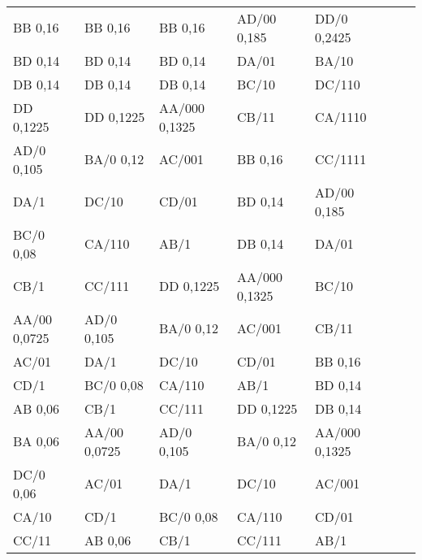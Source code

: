\documentclass[12pt]{article}
\begin{document}
\begin{enumerate}
\begin{tabular}{|l|l|l|l|l|l|ll}
\end{tabular}
\\
\\
\\
\begin{tabular}{|l|l|l|l|l|ll}
\cline{1-5}
BB 0,16      & BB 0,16      & BB 0,16       & AD/00 0,185   & DD/0 0,2425   &  &  \\ \cline{1-3}
BD 0,14      & BD 0,14      & BD 0,14       & DA/01         & BA/10         &  &  \\ \cline{1-3}
DB 0,14      & DB 0,14      & DB 0,14       & BC/10         & DC/110        &  &  \\ \cline{1-3}
DD 0,1225    & DD 0,1225    & AA/000 0,1325 & CB/11         & CA/1110       &  &  \\ \cline{1-2} \cline{4-4}
AD/0 0,105   & BA/0 0,12    & AC/001        & BB 0,16       & CC/1111       &  &  \\ \cline{4-5}
DA/1         & DC/10        & CD/01         & BD 0,14       & AD/00 0,185   &  &  \\ \cline{1-1} \cline{4-4}
BC/0 0,08    & CA/110       & AB/1          & DB 0,14       & DA/01         &  &  \\ \cline{3-4}
CB/1         & CC/111       & DD 0,1225     & AA/000 0,1325 & BC/10         &  &  \\ \cline{1-3}
AA/00 0,0725 & AD/0 0,105   & BA/0 0,12     & AC/001        & CB/11         &  &  \\ \cline{5-5}
AC/01        & DA/1         & DC/10         & CD/01         & BB 0,16       &  &  \\ \cline{2-2} \cline{5-5}
CD/1         & BC/0 0,08    & CA/110        & AB/1          & BD 0,14       &  &  \\ \cline{1-1} \cline{4-5}
AB 0,06      & CB/1         & CC/111        & DD 0,1225     & DB 0,14       &  &  \\ \cline{1-5}
BA 0,06      & AA/00 0,0725 & AD/0 0,105    & BA/0 0,12     & AA/000 0,1325 &  &  \\ \cline{1-1}
DC/0 0,06    & AC/01        & DA/1          & DC/10         & AC/001        &  &  \\ \cline{3-3}
CA/10        & CD/1         & BC/0 0,08     & CA/110        & CD/01         &  &  \\ \cline{2-2}
CC/11        & AB 0,06      & CB/1          & CC/111        & AB/1          &  &  \\ \cline{1-5}
\end{tabular}
\\

\end{enumerate}
\end{document}
